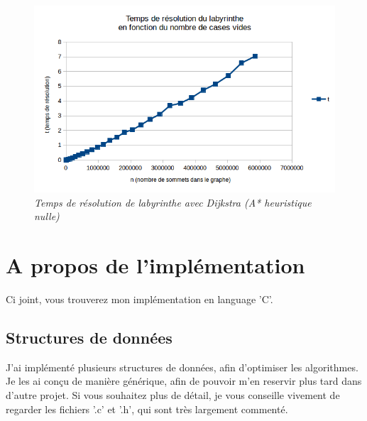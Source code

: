 \documentclass[10pt]{article}
\begin{document}
		\begin{figure}[H]
			\begin{center}
				\includegraphics[width=12cm,height=\textheight,keepaspectratio]{./images/courbe_temps.png}
			\end{center}
			\caption{\textit{Temps de résolution de labyrinthe avec Dijkstra (A* heuristique nulle)}}
		\end{figure}

	\newpage
	\section{A propos de l'implémentation}
		Ci joint, vous trouverez mon implémentation en language 'C'.
		\subsection{Structures de données}
		J'ai implémenté plusieurs structures de données, afin d'optimiser les algorithmes. Je les ai conçu de manière générique,
		afin de pouvoir m'en reservir plus tard dans d'autre projet. Si vous souhaitez plus de détail, je vous
		conseille vivement de regarder les fichiers '.c' et '.h', qui sont très largement commenté.
		
\end{document}
